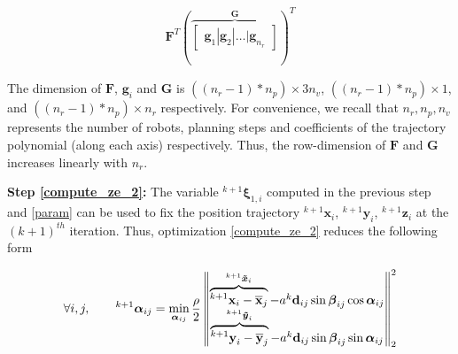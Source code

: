 \begin{align} 
   \textbf{F}^T( \overbrace{\begin{bmatrix}
    \textbf{g}_1|\textbf{g}_2|\dots|\textbf{g}_{n_r}
    \end{bmatrix}}^{\textbf{G}})^T
\end{align}

\noindent The dimension of $\textbf{F}$, $\textbf{g}_i$ and $\textbf{G}$ is $( (n_r-1)*n_p) \times 3n_v$, $((n_r-1)*n_p)\times 1$, and  $((n_r-1)*n_p)\times n_r$ respectively. For convenience, we recall that $n_r, n_p, n_v$ represents the number of robots, planning steps and coefficients of the trajectory polynomial (along each axis) respectively. Thus, the row-dimension of $\textbf{F}$ and $\textbf{G}$  increases linearly with $n_r$.



\noindent \textbf{Step \eqref{compute_ze_2}:} The variable ${^{k+1}}\boldsymbol{\xi}_{1, i}$  computed in the previous step and \eqref{param} can be used to fix the position trajectory ${^{k+1}}\boldsymbol{x}_{i}$,  ${^{k+1}}\boldsymbol{y}_{i}$, ${^{k+1}}\boldsymbol{z}_{i}$ at the $(k+1)^{th}$ iteration. Thus, optimization \eqref{compute_ze_2} reduces the following form



 

\begin{align}
\forall i, j, \qquad {^{k+1}}\boldsymbol{\alpha}_{ij} =   \min_{\boldsymbol{\alpha}_{ij}} 
\frac{\rho}{2} 
\left\Vert  \begin{matrix}
 \overbrace{  
  {^{k+1}}\textbf{x}_{i} - \overline{\textbf{x}}_{j}
}^{{^{k+1}}\boldsymbol{\Tilde{x}}_{i}}
 -a{^{k}} \textbf{d}_{ij} \sin{\boldsymbol{\beta}_{ij}}\cos{\boldsymbol{\alpha}_{ij}} 
\\
 \overbrace{
  {^{k+1}}\textbf{y}_{i} -  \overline{\textbf{y}}_{j}
 }^{{^{k+1}}\boldsymbol{\Tilde{y}}_{i}}
 -a{^{k}}\textbf{d}_{ij}\sin{\boldsymbol{\beta}_{ij}}\sin{\boldsymbol{\alpha}_{ij}} \\
 \end{matrix}
 \right \Vert_2^2 
 \label{compute_zeta_22}  
 \end{align}
 
